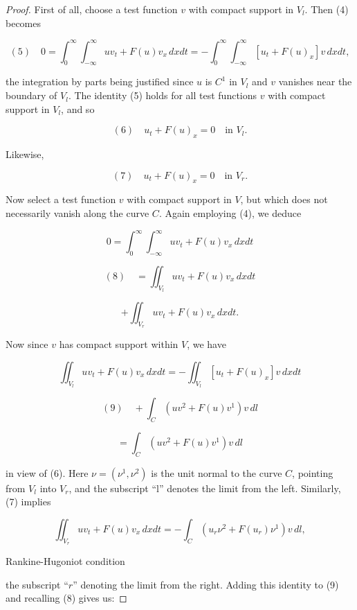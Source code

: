\begin{proof}
First of all, choose a test function $v$ with compact support in $V_l$. Then (4) becomes

$$
(5) \quad 0 = \int_0^\infty \int_{-\infty}^\infty uv_t + F(u)v_x \, dx dt = -\int_0^\infty \int_{-\infty}^\infty [u_t + F(u)_x]v \, dx dt,
$$

the integration by parts being justified since $u$ is $C^1$ in $V_l$ and $v$ vanishes near the boundary of $V_l$. The identity (5) holds for all test functions $v$ with compact support in $V_l$, and so

$$
(6) \quad u_t + F(u)_x = 0 \quad \text{in } V_l.
$$

Likewise,

$$
(7) \quad u_t + F(u)_x = 0 \quad \text{in } V_r.
$$

Now select a test function $v$ with compact support in $V$, but which does not necessarily vanish along the curve $C$. Again employing (4), we deduce

$$
0 = \int_0^\infty \int_{-\infty}^\infty uv_t + F(u)v_x \, dx dt
$$

$$
(8) \quad = \iint_{V_l} uv_t + F(u)v_x \, dx dt
$$

$$
+ \iint_{V_r} uv_t + F(u)v_x \, dx dt.
$$

Now since $v$ has compact support within $V$, we have

$$
\iint_{V_l} uv_t + F(u)v_x \, dx dt = -\iint_{V_l} [u_t + F(u)_x]v \, dx dt
$$

$$
(9) \quad + \int_C (uv^2 + F(u)v^1)v \, dl
$$

$$
= \int_C (uv^2 + F(u)v^1)v \, dl
$$

in view of (6). Here $\nu = (\nu^1, \nu^2)$ is the unit normal to the curve $C$, pointing from $V_l$ into $V_r$, and the subscript ``l'' denotes the limit from the left. Similarly, (7) implies

$$
\iint_{V_r} uv_t + F(u)v_x \, dx dt = -\int_C (u_r\nu^2 + F(u_r)\nu^1)v \, dl,
$$

\begin{figure}[h]\centering
\end{figure}

Rankine-Hugoniot condition

the subscript ``$r$'' denoting the limit from the right. Adding this identity to (9) and recalling (8) gives us:


\end{proof}
